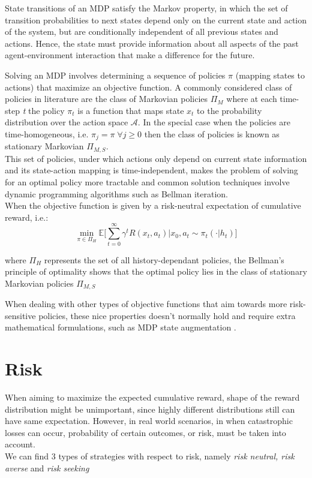 State transitions of an MDP satisfy the Markov property, in which
the set of transition probabilities to next states depend only on the current state and action of the system,
but are conditionally independent of all previous states and actions. Hence, the state must
provide information about all aspects of the past agent-environment interaction that
make a difference for the future.

Solving an MDP involves determining a sequence of policies $\pi$ (mapping states to actions)
that maximize an objective function.
A commonly considered class of policies in literature are the class of Markovian policies $\Pi_M$ where
at each time-step \textit{t} the policy $\pi_t$ is a function that maps state $x_t$ to 
the probability distribution over the action space $\mathcal{A}$. 
In the special case when the policies are time-homogeneous, i.e. $\pi_j = \pi \; \forall j \geq 0$ then the
class of policies is known as stationary Markovian $\Pi_{M,S}$.\\
This set of policies, under which actions only depend on current state information and
its state-action mapping is time-independent, makes the problem of solving for an optimal policy more
tractable and common solution techniques involve dynamic programming algorithms \citep{Bertsekas1995}
such as Bellman iteration.\\
When the objective function is given by a risk-neutral expectation of cumulative reward,
i.e.:
\begin{equation}
    \underset{\pi \in \Pi_H}{\min} \mathbb E  \big [  \sum_{t=0}^{\infty} \gamma^t R(x_t,a_t) | x_0, a_t \sim \pi_t(\cdot |h_t)  \big]
\end{equation} 

where $ \Pi_H$ represents the set of all history-dependant policies,
the Bellman's principle of optimality \citep{Bertsekas1995} shows that the optimal
policy lies in the class of stationary Markovian policies $\Pi_{M,S}$

When dealing with other types of objective functions that aim towards more risk-sensitive
policies, these nice properties doesn't normally hold
and require extra mathematical formulations, such as MDP state augmentation \citep{Chow2015}.



\section{Risk}
When aiming to maximize the expected cumulative reward, shape of the reward distribution might be unimportant,
since highly different distributions still can have same expectation.
However, in real world scenarios, 
in  when catastrophic losses can occur, probability of certain outcomes, or risk, must be taken into account.\\
We can find 3 types of strategies with respect to risk, namely \textit{risk neutral, risk averse} and \textit{risk seeking}

